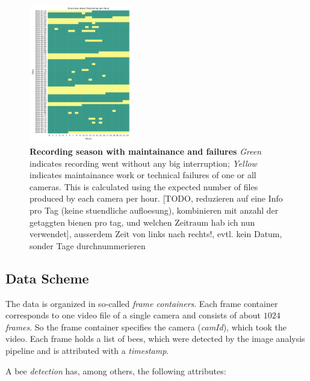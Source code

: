 \begin{figure}[htb]
	\centering
	\includegraphics[width=0.4\textwidth]{Figures/recording}
	\caption[Recording season with maintainance and failures]{\textbf{Recording season with maintainance and failures} \emph{Green} indicates recording went without any big interruption; \emph{Yellow} indicates maintainance work or technical failures of one or all cameras. This is calculated using the expected number of files produced by each camera per hour. [TODO, reduzieren auf eine Info pro Tag (keine stuendliche aufloesung), kombinieren mit anzahl der getaggten bienen pro tag, und welchen Zeitraum hab ich nun verwendet], ausserdem Zeit von links nach rechts!, evtl. kein Datum, sonder Tage durchnummerieren}
	\label{fig:period}
\end{figure}

\clearpage
\subsection{Data Scheme}
\label{subsec:datascheme}
The data is organized in so-called \emph{frame containers}.
Each frame container corresponds to one video file of a single camera and consists of about $1024$ \emph{frames}. So the frame container specifies the camera (\emph{camId}), which took the video.
Each frame holds a list of bees, which were detected by the image analysis pipeline and is attributed with a \emph{timestamp}.

A bee \emph{detection} has, among others, the following attributes:

